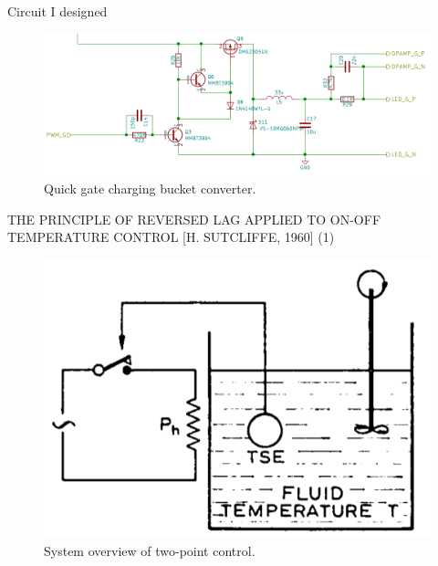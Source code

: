 \documentclass[apectratio=169]{beamer}
\begin{document}
\begin{frame}{Circuit I designed}  
\begin{figure}
    \centering
    \includegraphics[scale = 0.42]{./fig/mycic}
    \caption{Quick gate charging bucket converter.}
  \end{figure}	
\end{frame}

\begin{frame}{THE PRINCIPLE OF REVERSED LAG APPLIED TO ON-OFF TEMPERATURE
CONTROL [H. SUTCLIFFE, 1960] (1)}
  \begin{figure}
    \centering
    \includegraphics[scale = 0.6]{./fig/paper21}
    \caption{System overview of two-point control.}
  \end{figure}	
\end{frame}
\end{document}
